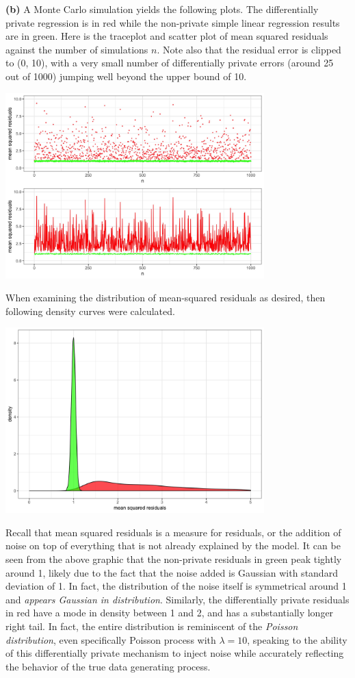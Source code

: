 \documentclass[12pt]{article}
\begin{document}
\textbf{(b)} A Monte Carlo simulation yields the following plots. The differentially private regression is in red while the non-private simple linear regression results are in green. Here is the traceplot and scatter plot of mean squared residuals against the number of simulations $n$. Note also that the residual error is clipped to (0, 10), with a very small number of differentially private errors (around 25 out of 1000) jumping well beyond the upper bound of 10.
\begin{center}\includegraphics[width=0.75\textwidth]{msrs}\end{center}
When examining the distribution of mean-squared residuals as desired, then following density curves were calculated.
\begin{center}\includegraphics[width=0.75\textwidth]{msrsdist}\end{center} 
Recall that mean squared residuals is a measure for residuals, or the addition of noise on top of everything that is not already explained by the model. It can be seen from the above graphic that the non-private residuals in green peak tightly around 1, likely due to the fact that the noise added is Gaussian with standard deviation of 1. In fact, the distribution of the noise itself is symmetrical around 1 and \emph{appears Gaussian in distribution}. Similarly, the differentially private residuals in red have a mode in density between 1 and 2, and has a substantially longer right tail. In fact, the entire distribution is reminiscent of the \emph{Poisson distribution}, even specifically Poisson process with $\lambda=10$, speaking to the ability of this differentially private mechanism to inject noise while accurately reflecting the behavior of the true data generating process.
\end{document}
